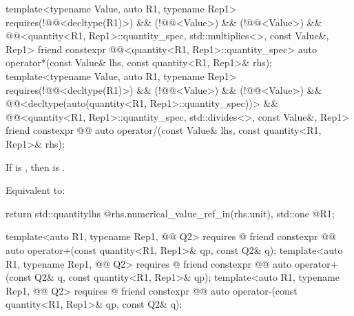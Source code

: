 \begin{itemdecl}
template<typename Value, auto R1, typename Rep1>
  requires(!@@<decltype(R1)>) &&
          (!@@<Value>) && (!@@<Value>) &&
          @@<quantity<R1, Rep1>::quantity_spec, std::multiplies<>, const Value&, Rep1>
friend constexpr @@<quantity<R1, Rep1>::quantity_spec> auto operator*(const Value& lhs,
                                                                               const quantity<R1, Rep1>& rhs);
template<typename Value, auto R1, typename Rep1>
  requires(!@@<decltype(R1)>) &&
          (!@@<Value>) && (!@@<Value>) &&
          @@<decltype(auto(quantity<R1, Rep1>::quantity_spec))> &&
          @@<quantity<R1, Rep1>::quantity_spec, std::divides<>, const Value&, Rep1>
friend constexpr @@ auto operator/(const Value& lhs, const quantity<R1, Rep1>& rhs);
\end{itemdecl}

\begin{itemdescr}
\pnum
\expects
If  is \tcode{/}, then  is .

\pnum
\effects
Equivalent to:
\begin{codeblock}
return std::quantity{lhs @\atsign@ rhs.numerical_value_ref_in(rhs.unit), std::one @\atsign@ R1};
\end{codeblock}
\end{itemdescr}

\begin{itemdecl}
template<auto R1, typename Rep1, @@ Q2>
  requires @\seebelownc@
friend constexpr @@ auto operator+(const quantity<R1, Rep1>& qp, const Q2& q);
template<auto R1, typename Rep1, @@ Q2>
  requires @\seebelownc@
friend constexpr @@ auto operator+(const Q2& q, const quantity<R1, Rep1>& qp);
template<auto R1, typename Rep1, @@ Q2>
  requires @\seebelownc@
friend constexpr @@ auto operator-(const quantity<R1, Rep1>& qp, const Q2& q);
\end{itemdecl}

